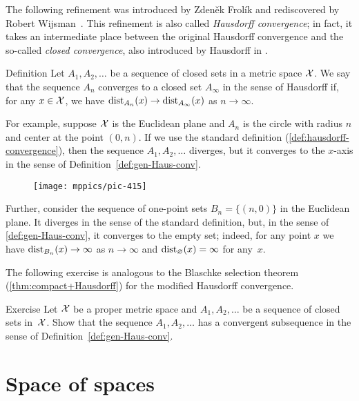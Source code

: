 The following refinement was introduced by  Zdeněk Frolík \cite{frolik} and rediscovered by Robert Wijsman~\cite{wijsman}.  
This refinement is also called \emph{Hausdorff convergence};
in fact, it takes an intermediate place between the original Hausdorff convergence and the so-called \textit{closed convergence}, also introduced by Hausdorff in \cite{hausdorff}.

\begin{thm}{Definition}\label{def:gen-Haus-conv}
Let $A_1,A_2,\dots$ be a sequence of closed sets in a metric space $\mathcal{X}$.
We say that the sequence $A_n$ converges to a closed set $A_\infty$ in the sense of Hausdorff if, for any $x\in\mathcal{X}$, we have
$\distfun_{A_n}(x)\z\to \distfun_{A_\infty}(x)$ as $n\to\infty$.
\end{thm}

For example, suppose $\mathcal{X}$ is the Euclidean plane and $A_n$ is the circle with radius $n$ and center at the point $(0,n)$.
If we use the standard definition (\ref{def:hausdorff-convergence}), then the sequence $A_1,A_2,\dots$ diverges, but it converges to the $x$-axis in the sense of Definition~\ref{def:gen-Haus-conv}.

\begin{figure}[ht!]
\vskip-0mm
\centering
\texttt{[image: mppics/pic-415]}
\end{figure}

Further, consider the sequence of one-point sets $B_n=\{(n,0)\}$ in the Euclidean plane.
It diverges in the sense of the standard definition, but, in the sense of \ref{def:gen-Haus-conv}, it converges to the empty set;
indeed, for any point $x$ we have $\mathrm{dist}_{B_n}(x)\to\infty$ as $n\to \infty$ and $\mathrm{dist}_{\varnothing}(x)= \infty$ for any~$x$.

The following exercise is analogous to the Blaschke selection theorem (\ref{thm:compact+Hausdorff}) for the modified Hausdorff convergence.

\begin{thm}{Exercise}\label{ex:generalized-selection}
Let $\mathcal{X}$ be a proper metric space
and $A_1,A_2,\dots$ be a sequence of closed sets in~$\mathcal{X}$.
Show that the sequence  $A_1,A_2,\dots$ has a convergent subsequence in the sense of Definition~\ref{def:gen-Haus-conv}.
\end{thm}

\chapter{Space of spaces}\label{chap:GH}

